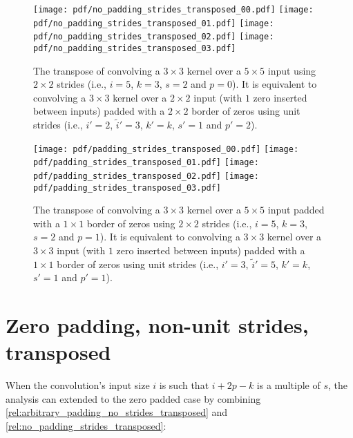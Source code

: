 \documentclass[notitlepage]{report}
\begin{document}
\begin{figure}[p]
    \centering
    \texttt{[image: pdf/no\_padding\_strides\_transposed\_00.pdf]}
    \texttt{[image: pdf/no\_padding\_strides\_transposed\_01.pdf]}
    \texttt{[image: pdf/no\_padding\_strides\_transposed\_02.pdf]}
    \texttt{[image: pdf/no\_padding\_strides\_transposed\_03.pdf]}
    \caption{\label{fig:no_padding_strides_transposed} The transpose of
        convolving a $3 \times 3$ kernel over a $5 \times 5$ input using $2
        \times 2$ strides (i.e., $i = 5$, $k = 3$, $s = 2$ and $p = 0$). It is
        equivalent to convolving a $3 \times 3$ kernel over a $2 \times 2$ input
        (with $1$ zero inserted between inputs) padded with a $2 \times 2$
        border of zeros using unit strides (i.e., $i' = 2$, $\tilde{i}' = 3$, $k'
        = k$, $s' = 1$ and $p' = 2$).}
\end{figure}

\begin{figure}[p]
    \centering
    \texttt{[image: pdf/padding\_strides\_transposed\_00.pdf]}
    \texttt{[image: pdf/padding\_strides\_transposed\_01.pdf]}
    \texttt{[image: pdf/padding\_strides\_transposed\_02.pdf]}
    \texttt{[image: pdf/padding\_strides\_transposed\_03.pdf]}
    \caption{\label{fig:padding_strides_transposed} The transpose of convolving
        a $3 \times 3$ kernel over a $5 \times 5$ input padded with a $1 \times
        1$ border of zeros using $2 \times 2$ strides (i.e., $i = 5$, $k = 3$, $s
        = 2$ and $p = 1$). It is equivalent to convolving a $3 \times 3$ kernel
        over a $3 \times 3$ input (with $1$ zero inserted between inputs) padded
        with a $1 \times 1$ border of zeros using unit strides (i.e., $i' = 3$,
        $\tilde{i}' = 5$, $k' = k$, $s' = 1$ and $p' = 1$).}
\end{figure}

\section{Zero padding, non-unit strides, transposed}

When the convolution's input size $i$ is such that $i + 2p - k$ is a multiple
of $s$, the analysis can extended to the zero padded case by combining
\autoref{rel:arbitrary_padding_no_strides_transposed} and
\autoref{rel:no_padding_strides_transposed}:
\end{document}
